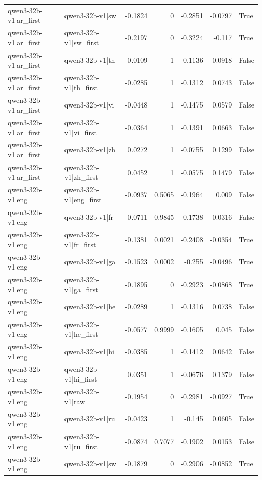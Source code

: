 \begin{table}
\begin{tabular}{l l r r r r l}
qwen3-32b-v1|ar_first & qwen3-32b-v1|sw & -0.1824 & 0 & -0.2851 & -0.0797 & True \\
qwen3-32b-v1|ar_first & qwen3-32b-v1|sw_first & -0.2197 & 0 & -0.3224 & -0.117 & True \\
qwen3-32b-v1|ar_first & qwen3-32b-v1|th & -0.0109 & 1 & -0.1136 & 0.0918 & False \\
qwen3-32b-v1|ar_first & qwen3-32b-v1|th_first & -0.0285 & 1 & -0.1312 & 0.0743 & False \\
qwen3-32b-v1|ar_first & qwen3-32b-v1|vi & -0.0448 & 1 & -0.1475 & 0.0579 & False \\
qwen3-32b-v1|ar_first & qwen3-32b-v1|vi_first & -0.0364 & 1 & -0.1391 & 0.0663 & False \\
qwen3-32b-v1|ar_first & qwen3-32b-v1|zh & 0.0272 & 1 & -0.0755 & 0.1299 & False \\
qwen3-32b-v1|ar_first & qwen3-32b-v1|zh_first & 0.0452 & 1 & -0.0575 & 0.1479 & False \\
qwen3-32b-v1|eng & qwen3-32b-v1|eng_first & -0.0937 & 0.5065 & -0.1964 & 0.009 & False \\
qwen3-32b-v1|eng & qwen3-32b-v1|fr & -0.0711 & 0.9845 & -0.1738 & 0.0316 & False \\
qwen3-32b-v1|eng & qwen3-32b-v1|fr_first & -0.1381 & 0.0021 & -0.2408 & -0.0354 & True \\
qwen3-32b-v1|eng & qwen3-32b-v1|ga & -0.1523 & 0.0002 & -0.255 & -0.0496 & True \\
qwen3-32b-v1|eng & qwen3-32b-v1|ga_first & -0.1895 & 0 & -0.2923 & -0.0868 & True \\
qwen3-32b-v1|eng & qwen3-32b-v1|he & -0.0289 & 1 & -0.1316 & 0.0738 & False \\
qwen3-32b-v1|eng & qwen3-32b-v1|he_first & -0.0577 & 0.9999 & -0.1605 & 0.045 & False \\
qwen3-32b-v1|eng & qwen3-32b-v1|hi & -0.0385 & 1 & -0.1412 & 0.0642 & False \\
qwen3-32b-v1|eng & qwen3-32b-v1|hi_first & 0.0351 & 1 & -0.0676 & 0.1379 & False \\
qwen3-32b-v1|eng & qwen3-32b-v1|raw & -0.1954 & 0 & -0.2981 & -0.0927 & True \\
qwen3-32b-v1|eng & qwen3-32b-v1|ru & -0.0423 & 1 & -0.145 & 0.0605 & False \\
qwen3-32b-v1|eng & qwen3-32b-v1|ru_first & -0.0874 & 0.7077 & -0.1902 & 0.0153 & False \\
qwen3-32b-v1|eng & qwen3-32b-v1|sw & -0.1879 & 0 & -0.2906 & -0.0852 & True \\

\end{tabular}
\end{table}

